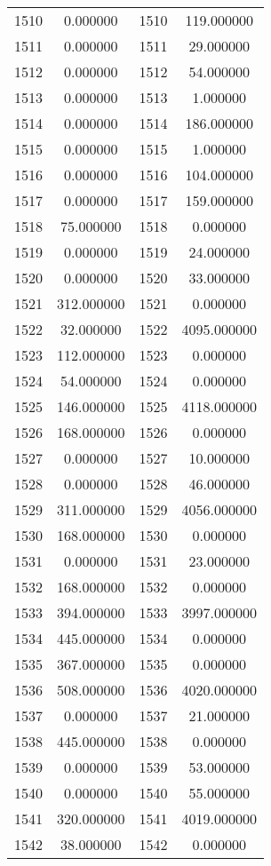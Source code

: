 \documentclass[12pt]{article}
\begin{document}
\begin{longtable}{@{}cccc@{}}
1510 & 0.000000 & 1510 & 119.000000 \\
1511 & 0.000000 & 1511 & 29.000000 \\
1512 & 0.000000 & 1512 & 54.000000 \\
1513 & 0.000000 & 1513 & 1.000000 \\
1514 & 0.000000 & 1514 & 186.000000 \\
1515 & 0.000000 & 1515 & 1.000000 \\
1516 & 0.000000 & 1516 & 104.000000 \\
1517 & 0.000000 & 1517 & 159.000000 \\
1518 & 75.000000 & 1518 & 0.000000 \\
1519 & 0.000000 & 1519 & 24.000000 \\
1520 & 0.000000 & 1520 & 33.000000 \\
1521 & 312.000000 & 1521 & 0.000000 \\
1522 & 32.000000 & 1522 & 4095.000000 \\
1523 & 112.000000 & 1523 & 0.000000 \\
1524 & 54.000000 & 1524 & 0.000000 \\
1525 & 146.000000 & 1525 & 4118.000000 \\
1526 & 168.000000 & 1526 & 0.000000 \\
1527 & 0.000000 & 1527 & 10.000000 \\
1528 & 0.000000 & 1528 & 46.000000 \\
1529 & 311.000000 & 1529 & 4056.000000 \\
1530 & 168.000000 & 1530 & 0.000000 \\
1531 & 0.000000 & 1531 & 23.000000 \\
1532 & 168.000000 & 1532 & 0.000000 \\
1533 & 394.000000 & 1533 & 3997.000000 \\
1534 & 445.000000 & 1534 & 0.000000 \\
1535 & 367.000000 & 1535 & 0.000000 \\
1536 & 508.000000 & 1536 & 4020.000000 \\
1537 & 0.000000 & 1537 & 21.000000 \\
1538 & 445.000000 & 1538 & 0.000000 \\
1539 & 0.000000 & 1539 & 53.000000 \\
1540 & 0.000000 & 1540 & 55.000000 \\
1541 & 320.000000 & 1541 & 4019.000000 \\
1542 & 38.000000 & 1542 & 0.000000 \\

\end{longtable}
\end{document}
